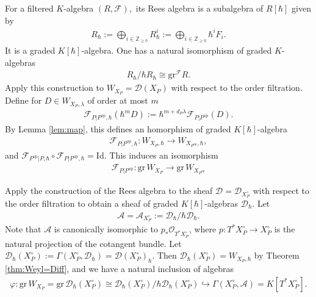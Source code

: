 \documentclass[11pt,a4paper,usenames,dvipsnames,reqno]{amsart}
\numberwithin{equation}{section}
\newcommand{\zz}{\mathbb Z}
\theoremstyle{definition}
\theoremstyle{remark}
\begin{document}
For a filtered $K$-algebra $(R,\mathcal{F}),$ its Rees algebra is a subalgebra of $R[\hbar]$ given by
\begin{align*}
    R_{\hbar}:=\bigoplus_{i\in \zz_{\ge 0}} R_{\hbar}^{i}:=\bigoplus_{i\in \zz_{\ge 0}} \hbar^{i}F_i.
\end{align*}
It is a graded $K[\hbar]$-algebra. One has a natural isomorphism of graded $K$-algebras
\begin{align*}
    R_{\hbar}/\hbar R_{\hbar}\cong \mathrm{gr}^{\mathcal{F}}R.
\end{align*}
Apply this construction to $W_{X_P}=\mathcal{D}(X_P)$ with respect to the order filtration.  Define for $D\in W_{X_P,\lambda}$ of order at most $m$
\begin{align*}
        \mathcal{F}_{P|P^{\mathrm{op}},\hbar}(\hbar^mD):=\hbar^{m+d_P\lambda} \mathcal{F}_{P|P^{\mathrm{op}}}(D).
\end{align*}
By Lemma \ref{lem:map}, this defines an homorphism of graded $K[\hbar]$-algebra 
\begin{align*}
        \mathcal{F}_{P|P^{\mathrm{op}},\hbar}: W_{X_P,\hbar}\longrightarrow W_{X_{P^{\mathrm{op}}},\hbar},
\end{align*}
and $\mathcal{F}_{P^{\mathrm{op}}|P,\hbar}\circ \mathcal{F}_{P|P^{\mathrm{op}},\hbar}=\mathrm{Id}.$ This induces an isomorphism
\begin{align}\label{eq:Fhdescends}
    \mathcal{F}_{P|P^{\mathrm{op}}}: \mathrm{gr}\, W_{X_P}\longrightarrow \mathrm{gr}\, W_{X_{P^{\mathrm{op}}}}
\end{align}

 Apply the construction of the Rees algebra to the sheaf $\mathcal{D}=\mathcal{D}_{X_P^\circ}$ with respect to the order filtration to obtain a sheaf of graded $K[\hbar]$-algebras $\mathcal{D}_{\hbar}.$ Let
\begin{align*}
    \mathcal{A}=\mathcal{A}_{X_P^\circ}:=\mathcal{D}_{\hbar}/\hbar\mathcal{D}_{\hbar}.
\end{align*}
Note that $\mathcal{A}$ is canonically isomorphic to $p_\ast \mathcal{O}_{T^\ast X_P^\circ}$, where $p:T^\ast X_P^\circ\to X_P^\circ$ is the natural projection of the cotangent bundle. Let $\mathcal{D}_{\hbar}(X_P^\circ):=\Gamma(X_P^\circ,\mathcal{D}_{\hbar})=\mathcal{D}(X_P^\circ)_{\hbar}$. Then $\mathcal{D}_{\hbar}(X_P^\circ)=W_{X_P,\hbar}$ by Theorem \ref{thm:Weyl=Diff}, and we have a natural inclusion of algebras
\begin{align*}
    \varphi:\mathrm{gr}\,W_{X_P}=\mathrm{gr}\, \mathcal{D}_{\hbar}(X_P^\circ)\cong \mathcal{D}_{\hbar}(X_P^\circ)/\hbar\mathcal{D}_{\hbar}(X_P^\circ)\hookrightarrow\Gamma(X_P^\circ,\mathcal{A})=K[T^\ast X_P^\circ].
\end{align*}
\end{document}
